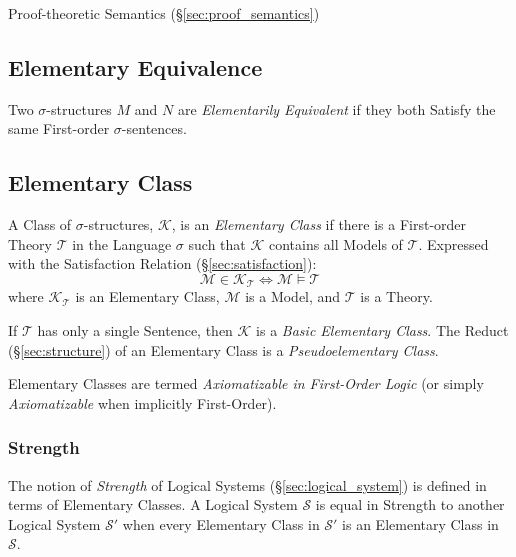 Proof-theoretic Semantics (\S\ref{sec:proof_semantics})



\subsection{Elementary Equivalence}\label{sec:elementary_equivalence}

Two $\sigma$-structures $M$ and $N$ are \emph{Elementarily Equivalent}
if they both Satisfy the same First-order $\sigma$-sentences.



\subsection{Elementary Class}\label{sec:elementary_class}

A Class of $\sigma$-structures, $\mathcal{K}$, is an \emph{Elementary
  Class} if there is a First-order Theory $\mathcal{T}$ in the
Language $\sigma$ such that $\mathcal{K}$ contains all Models of
$\mathcal{T}$. Expressed with the Satisfaction Relation
(\S\ref{sec:satisfaction}):
\[
  \mathcal{M} \in \mathcal{K}_\mathcal{T}
  \Leftrightarrow \mathcal{M} \models \mathcal{T}
\]
where $\mathcal{K}_\mathcal{T}$ is an Elementary Class, $\mathcal{M}$
is a Model, and $\mathcal{T}$ is a Theory.

If $\mathcal{T}$ has only a single Sentence, then $\mathcal{K}$ is a
\emph{Basic Elementary Class}. The Reduct (\S\ref{sec:structure}) of
an Elementary Class is a \emph{Pseudoelementary Class}.

Elementary Classes are termed \emph{Axiomatizable in First-Order
  Logic} (or simply \emph{Axiomatizable} when implicitly First-Order).



\subsubsection{Strength}\label{sec:strength}

The notion of \emph{Strength} of Logical Systems
(\S\ref{sec:logical_system}) is defined in terms of Elementary
Classes. A Logical System $\mathcal{S}$ is equal in Strength to
another Logical System $\mathcal{S}'$ when every Elementary Class in
$\mathcal{S}'$ is an Elementary Class in $\mathcal{S}$.



